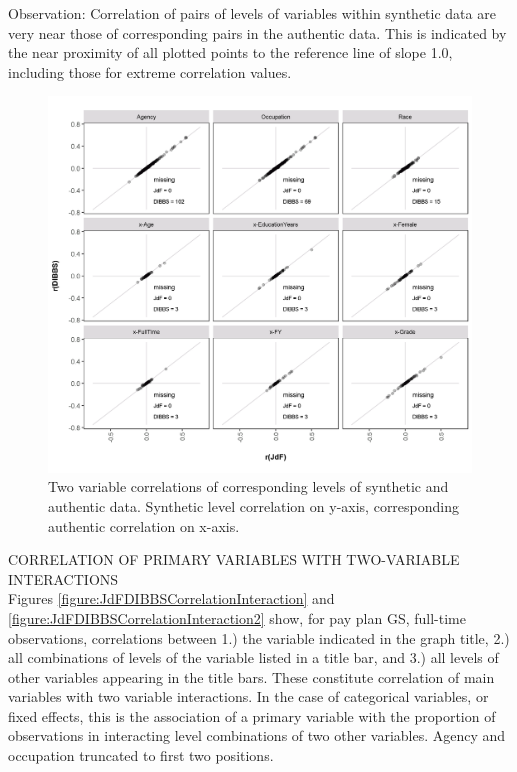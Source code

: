 \documentclass[10pt, letterpaper]{article}
\begin{document}
\begin{spacing}{1.0}
Observation:  Correlation of pairs of levels of variables within synthetic data are very near those of  corresponding pairs in the authentic data. This is indicated by the near proximity of all plotted points to the reference line of slope 1.0, including those for extreme correlation values.  

\begin{figure}[ht]
    \includegraphics[width=6.5in]{JdFDIBBSCorrelation.png}
    \centering
    \caption{Two variable correlations of corresponding levels of synthetic and authentic data.  Synthetic level correlation on y-axis, corresponding authentic correlation on x-axis.}
    \label{figure:JdFDIBBSCorrelation}
\end{figure}  

\clearpage

CORRELATION OF PRIMARY VARIABLES WITH TWO-VARIABLE INTERACTIONS\\

Figures \ref{figure:JdFDIBBSCorrelationInteraction} and \ref{figure:JdFDIBBSCorrelationInteraction2} show, for pay plan GS, full-time observations, correlations between 1.) the variable indicated in the graph title, 2.) all combinations of levels of the variable listed in a title bar, and 3.) all levels of other variables appearing in the title bars.  These constitute correlation of main variables with two variable interactions.  In the case of categorical variables, or fixed effects, this is the association of a primary variable with the proportion of observations in interacting level combinations of two other variables.  Agency and occupation truncated to first two positions.\\


\end{spacing}
\end{document}

